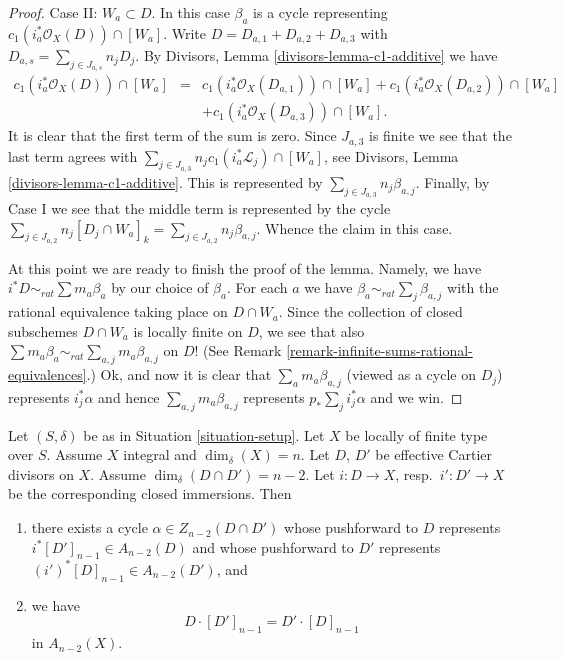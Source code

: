 \begin{proof}
\medskip\noindent
Case II: $W_a \subset D$. In this case $\beta_a$ is a cycle representing
$c_1(i_a^*\mathcal{O}_X(D)) \cap [W_a]$.
Write $D = D_{a, 1} + D_{a, 2} + D_{a, 3}$ with
$D_{a, s} = \sum_{j \in J_{a, s}} n_jD_j$.
By Divisors, Lemma \ref{divisors-lemma-c1-additive} we have
\begin{eqnarray*}
c_1(i_a^*\mathcal{O}_X(D)) \cap [W_a] & = &
c_1(i_a^*\mathcal{O}_X(D_{a, 1})) \cap [W_a] +
c_1(i_a^*\mathcal{O}_X(D_{a, 2})) \cap [W_a] \\
& &
 + c_1(i_a^*\mathcal{O}_X(D_{a, 3})) \cap [W_a].
\end{eqnarray*}
It is clear that the first term of the sum is zero.
Since $J_{a, 3}$ is finite we see that the last term agrees
with $\sum\nolimits_{j \in J_{a, 3}} n_jc_1(i_a^*\mathcal{L}_j) \cap [W_a]$,
see Divisors, Lemma \ref{divisors-lemma-c1-additive}.
This is represented by $\sum_{j \in J_{a, 3}} n_j \beta_{a, j}$.
Finally, by Case I we see that the middle term is represented by the cycle
$\sum\nolimits_{j \in J_{a, 2}} n_j[D_j \cap W_a]_k =
\sum_{j \in J_{a, 2}} n_j\beta_{a, j}$.
Whence the claim in this case.

\medskip\noindent
At this point we are ready to finish the proof of the lemma.
Namely, we have $i^*D \sim_{rat} \sum m_a\beta_a$ by our
choice of $\beta_a$. For each $a$ we have
$\beta_a \sim_{rat} \sum_j \beta_{a, j}$ with the rational
equivalence taking place on $D \cap W_a$.
Since the collection of closed subschemes $D \cap W_a$
is locally finite on $D$, we see that also
$\sum m_a \beta_a \sim_{rat} \sum_{a, j} m_a\beta_{a, j}$
on $D$! (See Remark \ref{remark-infinite-sums-rational-equivalences}.)
Ok, and now it is clear that $\sum_a m_a\beta_{a, j}$ (viewed
as a cycle on $D_j$) represents $i_j^*\alpha$ and hence
$\sum_{a, j} m_a\beta_{a, j}$ represents $p_* \sum_j i_j^*\alpha$
and we win.
\end{proof}

\begin{lemma}
\label{lemma-commutativity-effective-Cartier-proper-intersection}
Let $(S, \delta)$ be as in Situation \ref{situation-setup}.
Let $X$ be locally of finite type over $S$.
Assume $X$ integral and $\dim_\delta(X) = n$.
Let $D$, $D'$ be effective Cartier divisors on $X$.
Assume $\dim_\delta(D \cap D') = n - 2$. Let $i : D \to X$,
resp.\ $i' : D' \to X$ be the corresponding closed immersions.
Then
\begin{enumerate}
\item there exists a cycle $\alpha \in Z_{n - 2}(D \cap D')$
whose pushforward to $D$ represents
$i^*[D']_{n - 1} \in A_{n - 2}(D)$
and whose pushforward to $D'$ represents
$(i')^*[D]_{n - 1} \in A_{n - 2}(D')$, and
\item we have
$$
D \cdot [D']_{n - 1}
=
D' \cdot [D]_{n - 1}
$$
in $A_{n - 2}(X)$.
\end{enumerate}
\end{lemma}

